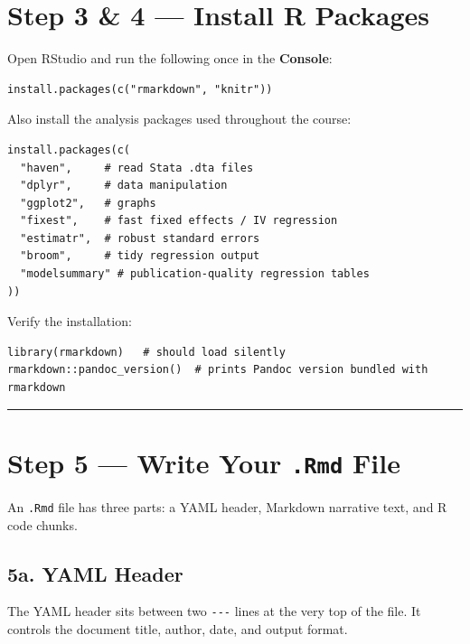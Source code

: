 \documentclass[paper=a4, fontsize=11pt]{scrartcl}
\newcommand{\horrule}[1]{\rule{\linewidth}{#1}}
\begin{document}
\section{Step 3 \& 4 --- Install R Packages}

Open RStudio and run the following once in the \textbf{Console}:

\begin{lstlisting}[style=rcode]
install.packages(c("rmarkdown", "knitr"))
\end{lstlisting}

Also install the analysis packages used throughout the course:

\begin{lstlisting}[style=rcode]
install.packages(c(
  "haven",     # read Stata .dta files
  "dplyr",     # data manipulation
  "ggplot2",   # graphs
  "fixest",    # fast fixed effects / IV regression
  "estimatr",  # robust standard errors
  "broom",     # tidy regression output
  "modelsummary" # publication-quality regression tables
))
\end{lstlisting}

Verify the installation:

\begin{lstlisting}[style=rcode]
library(rmarkdown)   # should load silently
rmarkdown::pandoc_version()  # prints Pandoc version bundled with rmarkdown
\end{lstlisting}

\bigskip\horrule{0.4pt}\bigskip

\section{Step 5 --- Write Your \texttt{.Rmd} File}

An \texttt{.Rmd} file has three parts: a YAML header, Markdown narrative text,
and R code chunks.

\subsection*{5a. YAML Header}

The YAML header sits between two \texttt{-{}-{}-} lines at the very top of the file.
It controls the document title, author, date, and output format.
\end{document}
